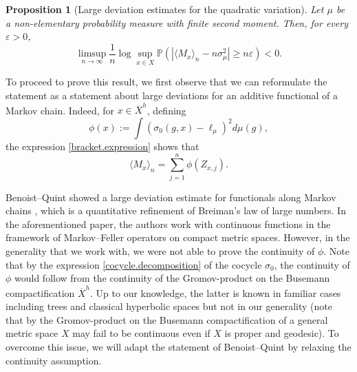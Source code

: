 \documentclass[10pt]{amsart}
\let\epsilon\varepsilon
\theoremstyle{plain}
\newtheorem{proposition}[theorem]{Proposition}
\theoremstyle{definition}
\newcommand\p{\mathbb{P}}
\begin{document}
\begin{proposition}[Large deviation estimates for the quadratic variation]
\label{prop.bracket.large.dev} Let $\mu$ be a non-elementary probability measure with finite second moment. Then, for every $\epsilon>0$,
\[
\limsup_{n\to \infty}\frac{1}{n} \log \sup_{x\in X}\p(| \langle M_x \rangle_n - n \sigma_{\mu}^2 | \geq n \epsilon)<0.
\]
\end{proposition}

To proceed to prove this result, we first observe that we can reformulate the statement as a statement about large deviations for an additive functional of a Markov chain. Indeed, for $x\in \overline{X}^h$, defining
\begin{equation}\label{eq.def.phi}
\phi(x):=\int{(\sigma_0(g,x) -\ell_{\mu})^2 d\mu(g)},
\end{equation}
the expression \eqref{bracket.expression} shows that
\[
\langle M_x \rangle_n=\sum_{j=1}^n{\phi(Z_{x,j})}.
\]

Benoist--Quint showed a large deviation estimate for functionals along Markov chains \cite[Prop.\,3.1]{BQ.CLT}, which is a quantitative refinement of Breiman's law of large numbers. In the aforementioned paper, the authors work with continuous functions in the framework of Markov--Feller operators on compact metric spaces. However, in the generality that we work with, we were not able to prove the continuity of $\phi$. Note that by the expression \eqref{cocycle.decomposition} of the cocycle $\sigma_0$, the continuity of $\phi$ would follow from the continuity of the Gromov-product on the Busemann compactification $\overline{X}^h$.
Up to our knowledge, the latter is known in familiar cases including trees and classical hyperbolic spaces but not in our generality (note that by \cite[\S 10]{miyachi} the Gromov-product on the Busemann compactification of a general metric space $X$ may fail to be continuous even if $X$ is proper and geodesic). To overcome this issue, we will adapt the statement of Benoist--Quint by relaxing the continuity assumption.
\end{document}
